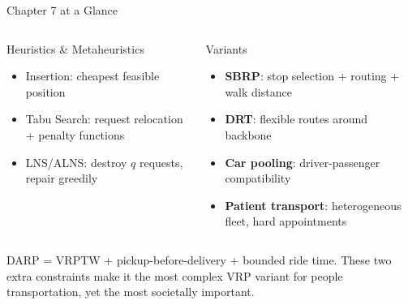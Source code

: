 \documentclass[aspectratio=169,10pt]{beamer}
\begin{document}
\begin{frame}[allowframebreaks]{Chapter 7 at a Glance}
\begin{columns}[t]
      \begin{block}{Heuristics \& Metaheuristics}
        \begin{itemize}\small
          \item Insertion: cheapest feasible position
          \item Tabu Search: request relocation + penalty functions
          \item LNS/ALNS: destroy $q$ requests, repair greedily
        \end{itemize}
      \end{block}
      \vspace{4pt}
      \begin{block}{Variants}
        \begin{itemize}\small
          \item \textbf{SBRP}: stop selection + routing + walk distance
          \item \textbf{DRT}: flexible routes around backbone
          \item \textbf{Car pooling}: driver-passenger compatibility
          \item \textbf{Patient transport}: heterogeneous fleet,
                hard appointments
        \end{itemize}
      \end{block}
  \end{columns}

  \vspace{6pt}
  \begin{alertblock}{}
    \centering\small
    DARP = VRPTW + pickup-before-delivery + bounded ride time.
    These two extra constraints make it the most complex VRP variant
    for people transportation, yet the most societally important.
  \end{alertblock}
\end{frame}
\end{document}
